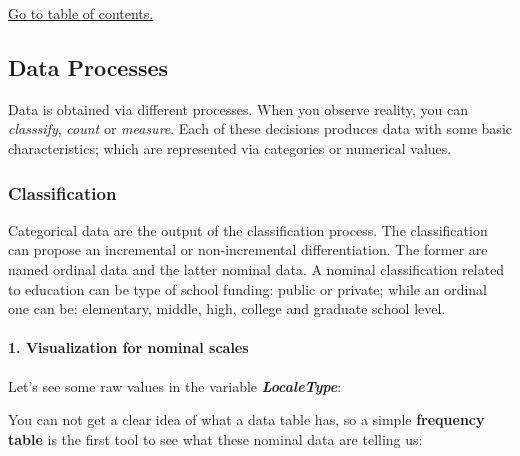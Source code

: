 \documentclass[]{article}
\newenvironment{Shaded}{\begin{snugshade}}{\end{snugshade}}
\newcommand{\KeywordTok}[1]{\textcolor[rgb]{0.13,0.29,0.53}{\textbf{#1}}}
\newcommand{\DataTypeTok}[1]{\textcolor[rgb]{0.13,0.29,0.53}{#1}}
\newcommand{\DecValTok}[1]{\textcolor[rgb]{0.00,0.00,0.81}{#1}}
\newcommand{\StringTok}[1]{\textcolor[rgb]{0.31,0.60,0.02}{#1}}
\newcommand{\CommentTok}[1]{\textcolor[rgb]{0.56,0.35,0.01}{\textit{#1}}}
\newcommand{\OperatorTok}[1]{\textcolor[rgb]{0.81,0.36,0.00}{\textbf{#1}}}
\newcommand{\NormalTok}[1]{#1}
\let\oldparagraph\paragraph
\renewcommand{\paragraph}[1]{\oldparagraph{#1}\mbox{}}
\begin{document}
\protect\hyperlink{part1}{Go to table of contents.}

\subsection{Data Processes}\label{data-processes}

Data is obtained via different processes. When you observe reality, you
can \emph{classsify}, \emph{count} or \emph{measure}. Each of these
decisions produces data with some basic characteristics; which are
represented via categories or numerical values.

\subsubsection{Classification}\label{classification}

Categorical data are the output of the classification process. The
classification can propose an incremental or non-incremental
differentiation. The former are named ordinal data and the latter
nominal data. A nominal classification related to education can be type
of school funding: public or private; while an ordinal one can be:
elementary, middle, high, college and graduate school level.

\paragraph{\texorpdfstring{{ 1. Visualization for nominal
scales}}{ 1. Visualization for nominal scales}}\label{visualization-for-nominal-scales}

Let's see some raw values in the variable \emph{\textbf{LocaleType}}:

\begin{Shaded}
\end{Shaded}

You can not get a clear idea of what a data table has, so a simple
\textbf{frequency table} is the first tool to see what these nominal
data are telling us:

\begin{Shaded}
\end{Shaded}
\end{document}

